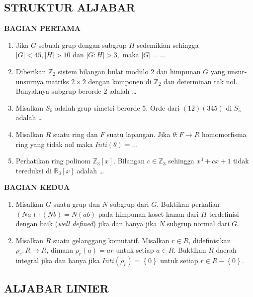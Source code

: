 \documentclass[12pt,twoside]{article}
\begin{document}
\newpage \subsection{STRUKTUR ALJABAR}

\textbf{BAGIAN PERTAMA}
\begin{enumerate}
	\item Jika $G$ sebuah grup dengan subgrup $H$ sedemikian sehingga $|G| < 45, |H|>10 $ dan $|G:H|>3,$ maka $|G|=\dots$

	\item Diberikan $\mathbb{Z}_2$ sistem bilangan bulat modulo 2 dan himpunan $G$ yang unsur-unsurnya matriks $2 \times 2$ dengan komponen di $\mathbb{Z}_2$ dan determinan tak nol. Banyaknya subgrup berorde 2 adalah \dots

	\item Misalkan $S_5$ adalah grup simetri berorde 5. Orde dari $(12)(345)$ di $S_5$ adalah \dots

	\item Misalkan $R$ suatu ring dan $F$ suatu lapangan. Jika $\theta : F \to R$ homomorfisma ring yang tidak nol maka $Inti(\theta)=\dots$

	\item Perhatikan ring polinom $\mathbb{Z}_3[x].$ Bilangan $c \in \mathbb{Z}_3$ sehingga $x^3 + cx + 1$ tidak tereduksi di $\mathbb{R}_3[x]$ adalah \dots
\end{enumerate}

\newpage \textbf{BAGIAN KEDUA}
\begin{enumerate}
	\item Misalkan $G$ suatu grup dan $N$ subgrup dari $G$. Buktikan perkalian $(Na)\cdot (Nb) = N(ab)$ pada himpunan koset kanan dari $H$ terdefinisi dengan baik (\textit{well defined}) jika dan hanya jika $N$ subgrup normal dari $G$.

	\item Misalkan $R$ suatu gelanggang komutatif. Misalkan $r \in R$, didefinisikan $\rho_r : R \to R$, dimana $\rho_r(a)=ar$ untuk setiap $a \in R$. Buktikan $R$ daerah integral jika dan hanya jika $Inti(\rho_r)=\left\lbrace 0 \right\rbrace$ untuk setiap $r \in R - \left\lbrace 0 \right\rbrace$.

\end{enumerate}


\newpage \subsection{ALJABAR LINIER}
\end{document}
